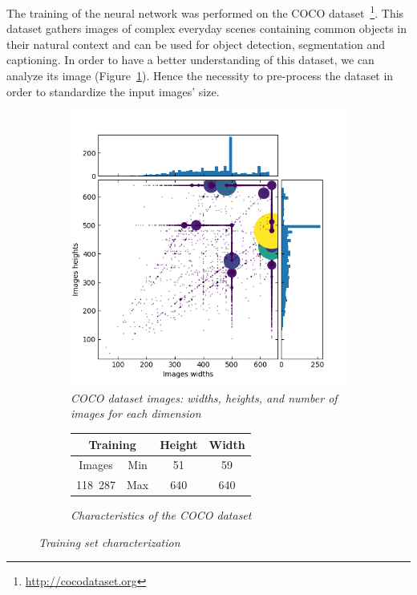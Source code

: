 \documentclass{article}
\begin{document}
        The training of the neural network was performed on the COCO dataset~\cite{microsoft2014}\footnote{\url{http://cocodataset.org}}. This dataset gathers images of complex everyday scenes containing common objects in their natural context and can be used for object detection, segmentation and captioning. In order to have a better understanding of this dataset, we can analyze its image (Figure~\ref{fig:train}). Hence the necessity to pre-process the dataset in order to standardize the input images' size.

        \begin{figure}[!ht]
            \begin{subfigure}{.49\linewidth}
                \centering
                \includegraphics[width=\linewidth]{pics/train2017full.png}
                \caption{\textit{COCO dataset images: widths, heights, and number of images for each dimension}}
            \end{subfigure}
            \begin{subfigure}{.49\linewidth}
                \center
                \begin{tabular}{|c||c|c|c|}
                    \hline
                    \multicolumn{2}{|c|}{Training} & Height & Width \\
                    \hline
                    \hline
                    Images & Min & 51 & 59 \\
                    \hline
                    118~287 & Max & 640 & 640 \\
                    \hline
                \end{tabular}
                \caption{\textit{Characteristics of the COCO dataset}}
            \end{subfigure}
            \caption{\textit{Training set characterization}}
            \label{fig:train}
        \end{figure}
\end{document}
